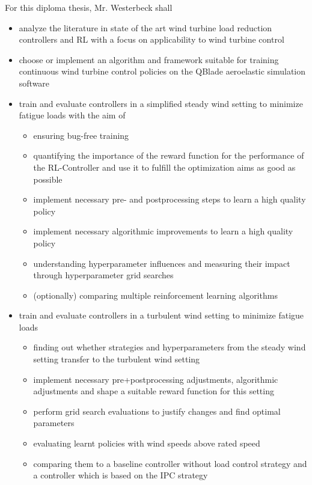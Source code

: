\documentclass{article}
\begin{document}
For this diploma thesis, Mr. Westerbeck shall 
\begin{itemize}
  \item analyze the literature in state of the art wind turbine load reduction controllers and \ac{RL} with a focus on applicability to wind turbine control 
  \item choose or implement an algorithm and framework suitable for training continuous wind turbine control policies on the QBlade aeroelastic simulation software \cite{martenQBladeModernTool2020}
  \item train and evaluate controllers in a simplified steady wind setting to minimize fatigue loads with the aim of
  \begin{itemize}
    \item ensuring bug-free training
    \item quantifying the importance of the reward function for the performance of the \ac{RL}-Controller and use it to fulfill the optimization aims as good as possible
    \item implement necessary pre- and postprocessing steps to learn a high quality policy
    \item implement necessary algorithmic improvements to learn a high quality policy
    \item understanding hyperparameter influences and measuring their impact through hyperparameter grid searches
    \item (optionally) comparing multiple reinforcement learning algorithms
  \end{itemize}
  \item train and evaluate controllers in a turbulent wind setting to minimize fatigue loads
  \begin{itemize}
    \item finding out whether strategies and hyperparameters from the steady wind setting transfer to the turbulent wind setting
    \item implement necessary pre+postprocessing adjustments, algorithmic adjustments and shape a suitable reward function for this setting
    \item perform grid search evaluations to justify changes and find optimal parameters
    \item evaluating learnt policies with wind speeds above rated speed
    \item comparing them to a baseline controller without load control strategy and a controller which is based on the \ac{IPC} strategy
  \end{itemize}

\end{itemize}
\end{document}
